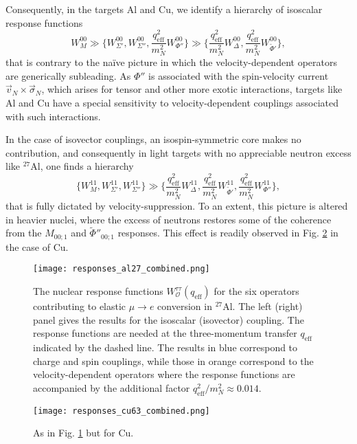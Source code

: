 \documentclass[12pt,letterpaper]{book}
\begin{document}
Consequently, in the targets Al and Cu, we identify a hierarchy of isoscalar response functions
\begin{equation}
W_M^{00}\gg \bigg\{W^{00}_{\Sigma'},W_{\Sigma''}^{00},\frac{q_\mathrm{eff}^2}{m_N^2}W^{00}_{\Phi''}\bigg\}\gg\bigg\{\frac{q_\mathrm{eff}^2}{m_N^2}W^{00}_{\Delta},\frac{q^2_\mathrm{eff}}{m_N^2}W_{\tilde{\Phi}'}^{00}\bigg\},
\end{equation}
that is contrary to the na\"ive picture in which the velocity-dependent operators are generically subleading. As $\Phi''$ is associated with the spin-velocity current $\vec{v}_N\times\vec{\sigma}_N$, which arises for tensor and other more exotic interactions, targets like Al and Cu have a special sensitivity to velocity-dependent couplings associated with such interactions. 

In the case of isovector couplings, an isospin-symmetric core makes no contribution, and consequently in light targets with no appreciable neutron excess like $^{27}$Al, one finds a hierarchy
\begin{equation}
\bigg\{W_M^{11},W^{11}_{\Sigma'},W_{\Sigma''}^{11}\bigg\}\gg\bigg\{\frac{q_\mathrm{eff}^2}{m_N^2}W^{11}_{\Delta},\frac{q^2_\mathrm{eff}}{m_N^2}W_{\tilde{\Phi}'}^{11},\frac{q^2_\mathrm{eff}}{m_N^2}W^{11}_{\Phi''}\bigg\},
\end{equation}
that is fully dictated by velocity-suppression. To an extent, this picture is altered in heavier nuclei, where the excess of neutrons restores some of the coherence from the $M_{00;1}$ and $\tilde{\Phi}''_{00;1}$ responses. This effect is readily observed in Fig. \ref{fig:Cu_responses} in the case of Cu.
\begin{figure}
\centering
\texttt{[image: responses\_al27\_combined.png]}
\caption{The nuclear response functions $W^{\tau\tau}_\mathcal{O}(q_\mathrm{eff})$ for the six operators contributing to elastic $\mu\rightarrow e$ conversion in $^{27}$Al. The left (right) panel gives the results for the isoscalar (isovector) coupling. The response functions are needed at the three-momentum transfer $q_\mathrm{eff}$ indicated by the dashed line. The results in blue correspond to charge and spin couplings, while those in orange correspond to the velocity-dependent operators where the response functions are accompanied by the additional factor $q^2_\mathrm{eff}/m_N^2\approx 0.014$.}
\label{fig:Al_responses}
\end{figure}
\begin{figure}
\centering
\texttt{[image: responses\_cu63\_combined.png]}
\caption{As in Fig. \ref{fig:Al_responses} but for Cu.}
\label{fig:Cu_responses}
\end{figure}
\end{document}
